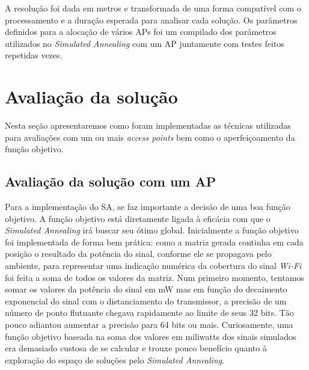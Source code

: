 \documentclass[
	12pt,				%
	openright,			%
	twoside,			%
	a4paper,			%
	english,			%
	french,				%
	spanish,			%
	brazil				%
	]{abntex2}
\begin{document}
A resolução foi dada em metros e transformada de uma forma compatível com o processamento e a duração esperada para analisar cada solução. Os parâmetros definidos para a alocação de vários APs foi um compilado dos parâmetros utilizados no \textit{Simulated Annealing} com um AP juntamente com testes feitos repetidas vezes.

\section[Avaliação da solução]{Avaliação da solução}

Nesta seção apresentaremos como foram implementadas as técnicas utilizadas para avaliações com um ou mais \textit{access points} bem como o aperfeiçoamento da função objetivo.

\subsection[Avaliação da solução com um AP]{Avaliação da solução com um AP}

Para a implementação do SA, se faz importante a decisão de uma boa função objetivo. A função objetivo está diretamente ligada à eficácia com que o \textit{Simulated Annealing} irá buscar seu ótimo global. Inicialmente a função objetivo foi implementada de forma bem prática: como a matriz gerada continha em cada posição o resultado da potência do sinal, conforme ele se propagava pelo ambiente, para representar uma indicação numérica da cobertura do sinal \textit{Wi-Fi} foi feita a soma de todos os valores da matriz. Num primeiro momento, tentamos somar os valores da potência do sinal em mW mas em função do decaimento exponencial do sinal com o distanciamento do transmissor, a precisão de um número de ponto flutuante chegava rapidamente ao limite de seus 32 bits. Tão pouco adiantou aumentar a precisão para 64 bits ou mais. Curiosamente, uma função objetivo baseada na soma dos valores em miliwatts dos sinais simulados era demasiado custosa de se calcular e trouxe pouco benefício quanto à exploração do espaço de soluções pelo \textit{Simulated Annealing}.
\end{document}
